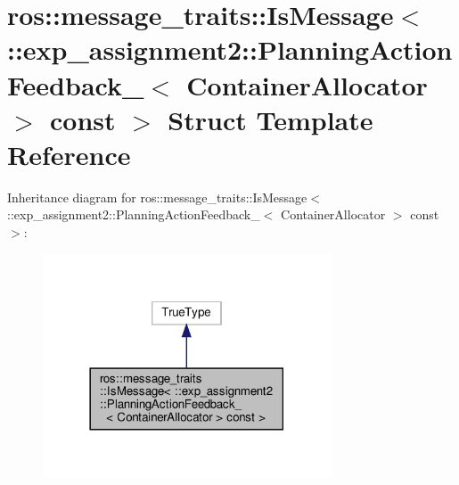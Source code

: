 \hypertarget{structros_1_1message__traits_1_1IsMessage_3_01_1_1exp__assignment2_1_1PlanningActionFeedback___303a1a4ca18f7366ad2763ae98b6a0a22}{}\section{ros\+:\+:message\+\_\+traits\+:\+:Is\+Message$<$ \+:\+:exp\+\_\+assignment2\+:\+:Planning\+Action\+Feedback\+\_\+$<$ Container\+Allocator $>$ const $>$ Struct Template Reference}
\label{structros_1_1message__traits_1_1IsMessage_3_01_1_1exp__assignment2_1_1PlanningActionFeedback___303a1a4ca18f7366ad2763ae98b6a0a22}


Inheritance diagram for ros\+:\+:message\+\_\+traits\+:\+:Is\+Message$<$ \+:\+:exp\+\_\+assignment2\+:\+:Planning\+Action\+Feedback\+\_\+$<$ Container\+Allocator $>$ const $>$\+:
\nopagebreak
\begin{figure}[H]
\begin{center}
\leavevmode
\includegraphics[width=242pt]{structros_1_1message__traits_1_1IsMessage_3_01_1_1exp__assignment2_1_1PlanningActionFeedback___347675622030b1cc243be5820f46a1647}
\end{center}
\end{figure}


